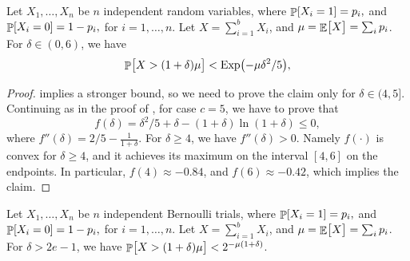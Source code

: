 \begin{fragment}{}
    \begin{lemma}
        Let $X_1, \ldots, X_n$ be $n$ independent random variables,
        where
        \begin{math}
            \Prob{  X_i = 1 } =p_i,
        \end{math}
        and 
        \begin{math}
            \Prob{  X_i = 0 } =1- p_i,
        \end{math}
        for $i=1,\ldots, n$.  Let $X = \sum_{i=1}^{b} X_i$, and
        $\mu = \mathop{\mathbb{E}}\!\left[ {\bigl. X} \right] = \sum_i p_i$.  For $\delta \in (0,6)$,
        we have
        \begin{equation*}
            \Prob{ \bigl. X > (1+\delta)\mu } < \Exp \pth{-\mu \delta^2 /
               5},
        \end{equation*}
    \end{lemma}
\end{fragment}
\begin{proof}
     implies a stronger bound, so we need
    to prove the claim only for $\delta \in (4,5]$.  Continuing as in
    the proof of , for case $c=5$, we
    have to prove that
    \begin{equation*}
        f(\delta) = \delta^2/5 + \delta -(1+\delta) \ln(1+\delta)
        \leq 0,
    \end{equation*}
    where
    \begin{math}
        f''(\delta) = 2/5 - \frac{1}{1+\delta}.
    \end{math}
    For $\delta \geq 4$, we have $f''(\delta) > 0$. Namely $f(\cdot)$
    is convex for $\delta \geq 4$, and it achieves its maximum on the
    interval $[4,6]$ on the endpoints. In particular,
    $f(4)\approx -0.84$, and $f(6) \approx -0.42$, which implies the
    claim.
\end{proof}





\begin{fragment}{}
    \begin{lemma}
        Let $X_1, \ldots, X_n$ be $n$ independent Bernoulli trials,
        where
        \begin{math}
            \Prob{ X_i = 1 } =p_i,
        \end{math}
        and
        \begin{math}
            \Prob{ X_i = 0 } =1- p_i,
        \end{math}
        for $i=1,\ldots, n$.  Let $X = \sum_{i=1}^{b} X_i$, and
        $\mu = \mathop{\mathbb{E}}\!\left[ {\bigl. X} \right] = \sum_i p_i$.  For $\delta > 2e-1$, we
        have
        $\Prob{ \bigl. X > (1+\delta)\mu } < 2^{-\mu (1 + \delta)}$.
    \end{lemma}
\end{fragment}

